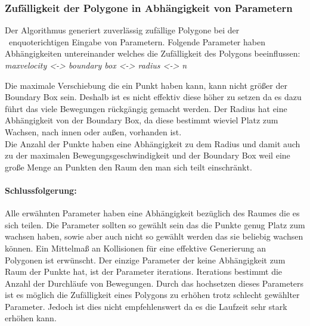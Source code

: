   \subsubsection{Zufälligkeit der Polygone in Abhängigkeit von Parametern}
    Der Algorithmus generiert zuverlässig zufällige Polygone bei der \
    enquote{richtigen} Eingabe von Parametern. Folgende Parameter haben 
    Abhängigkeiten untereinander welches die Zufälligkeit des Polygons 
    beeinflussen:\\
    \textit{maxvelocity <-> boundary box <-> radius <-> n}

    Die maximale Verschiebung die ein Punkt haben kann, kann nicht größer 
    der Boundary Box sein. Deshalb ist es nicht effektiv diese höher zu 
    setzen da es dazu führt das viele Bewegungen rückgängig gemacht werden.
    Der Radius hat eine Abhängigkeit von der Boundary Box, da diese 
    bestimmt wieviel Platz zum Wachsen, nach innen oder außen, vorhanden 
    ist.\\
    Die Anzahl der Punkte haben eine Abhängigkeit zu dem Radius und damit 
    auch zu der maximalen Bewegungsgeschwindigkeit und der Boundary Box 
    weil eine große Menge an Punkten den Raum den man sich teilt 
    einschränkt.
    \paragraph{Schlussfolgerung:}
    Alle erwähnten Parameter haben eine Abhängigkeit bezüglich des Raumes 
    die es sich teilen. Die Parameter sollten so gewählt sein das die 
    Punkte genug Platz zum wachsen haben, sowie aber auch nicht so gewählt 
    werden das sie beliebig wachsen können. Ein Mittelmaß an Kollisionen 
    für eine effektive Generierung an Polygonen ist erwünscht.
    Der einzige Parameter der keine Abhängigkeit zum Raum der Punkte hat, 
    ist der Parameter iterations. Iterations bestimmt die Anzahl der 
    Durchläufe von Bewegungen. Durch das hochsetzen dieses Parameters ist 
    es möglich die Zufälligkeit eines Polygons zu erhöhen trotz schlecht 
    gewählter Parameter. Jedoch ist dies nicht empfehlenswert da es die 
    Laufzeit sehr stark erhöhen kann.  

  
